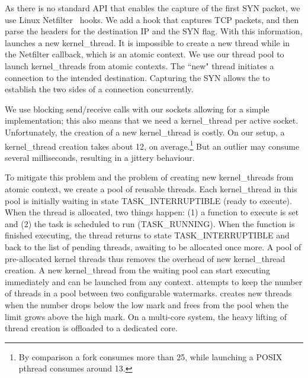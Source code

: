 As there is no standard API that enables the capture of the first SYN packet, we use Linux Netfilter~\cite{netfilter} hooks. We add a hook that captures TCP packets, and then parse the headers for the destination IP and the SYN flag. With this information, \oursys launches a new kernel\_thread. It is impossible to create a new thread while in the Netfilter callback, which is an atomic context. We use our thread pool to launch kernel\_threads from atomic contexts. The ``new" thread initiates a connection to the intended destination. Capturing the SYN allows the \relay to establish the two sides of a connection concurrently.

 We use blocking send/receive calls with our sockets allowing for a simple implementation; this also means that we need a kernel\_thread per active socket. Unfortunately, the creation of a new kernel\_thread is costly. On our setup, a kernel\_thread creation takes about 12\usec, on average.\footnote{By comparison a fork consumes more than 25\usec , while launching a POSIX pthread consumes around 13\usec.} But an outlier may consume several milliseconds, resulting in a jittery behaviour.

To mitigate this problem and the problem of creating new kernel\_threads from atomic context, we create a pool of reusable threads. Each kernel\_thread in this pool is initially waiting in state TASK\_INTERRUPTIBLE (ready to execute). When the thread is allocated, two things happen: (1) a function to execute is set and (2)  the task is scheduled to run (TASK\_RUNNING). When the function is finished executing, the thread returns to state TASK\_INTERRUPTIBLE and back to the list of pending threads, awaiting to be allocated once more. A pool of pre-allocated kernel threads thus removes the overhead of new kernel\_thread creation. A new kernel\_thread from the waiting pool can start executing immediately and can be launched from any context. %
\oursys attempts to keep the number of threads in a pool between two configurable watermarks. \oursys creates new threads when the number drops below the low mark and frees from the pool when the limit grows above the high mark. On a multi-core system, the heavy lifting of thread creation is offloaded to a dedicated core.

